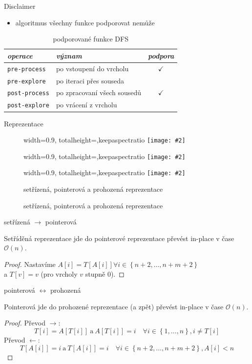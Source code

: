 \documentclass[czech]{beamer}
\makeatletter
\newcommand{\fitimage}[2][\@nil]{
	\begin{figure}
		\begin{adjustbox}{width=0.9\textwidth, totalheight=\textheight-2\baselineskip-2\baselineskip,keepaspectratio}
			\texttt{[image: \#2]}
		\end{adjustbox}
		\def\tmp{#1}%
	 \ifx\tmp\@nnil
			\else
			\caption{#1}
		\fi
	\end{figure}
}
\makeatother
\begin{document}
	\begin{frame}{Disclaimer}
		\begin{itemize}
			\item algoritmus všechny funkce podporovat nemůže
		\end{itemize}

		\begin{table}
			\centering
			\begin{tabular}{llc}
				\toprule
				\emph{operace} & \emph{význam} & \emph{podpora} \\
				\midrule
				\texttt{pre-process} & po vstoupení do vrcholu & $\checkmark$ \\
				\texttt{pre-explore} & po iteraci přes souseda &  \\
				\texttt{post-process} & po zpracovaní všech sousedů & $\checkmark$ \\
				\texttt{post-explore} & po vrácení z vrcholu &  \\
				\bottomrule
			\end{tabular}
			\caption{podporované funkce DFS}
		\end{table}
	\end{frame}

	\begin{frame}{Reprezentace}
		\fitimage{images/sorted.png}
		\fitimage{images/pointer.png}
		\fitimage[setřízená, pointerová a prohozená reprezentace]{images/swapped.png}
	\end{frame}

	\begin{frame}{setřízená $\rightarrow$ pointerová}
		\begin{lemma}
			Setříděná reprezentace jde do pointerové reprezentace převést in-place v čase $\mathcal{O}\left(n\right)$.
		\end{lemma}

		\begin{proof}
			Nastavíme $A[i] = T\left[A\left[i\right]\right] \forall i \in \left\{n + 2, \ldots, n + m + 2\right\}$ \\
			a $T\left[v\right] = v$ (pro vrcholy $v$ stupně $0$).
		\end{proof}
	\end{frame}

	\begin{frame}{pointerová $\longleftrightarrow$ prohozená}
		\begin{lemma}
			Pointerová jde do prohozené reprezentace (a zpět) převést in-place v čase $\mathcal{O}\left(n\right)$.
		\end{lemma}

		\begin{proof}
			Převod $\rightarrow$: $$T[i] = A[T[i]]\ \text{a}\ A[T[i]] = i\quad \forall i \in \left\{1, \ldots, n\right\}, i \neq T[i]$$
			Převod $\leftarrow$: $$T[A[i]] = i\ \text{a}\ T[A[i]] = i \quad \forall i \in \left\{n + 2, \ldots, n + m + 2\right\}, A[i] < n$$
		\end{proof}
	\end{frame}
\end{document}
